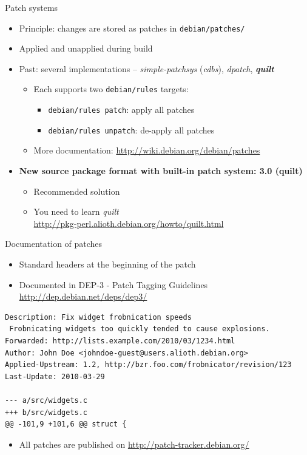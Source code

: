 \documentclass[10pt,final]{beamer}
\begin{document}
\begin{frame}{Patch systems}
  \begin{itemize}
  \item Principle: changes are stored as patches in \texttt{debian/patches/}
    \br
  \item Applied and unapplied during build
    \br
  \item Past: several implementations -- \textsl{simple-patchsys} (\textsl{cdbs}),
    \textsl{dpatch}, \textbf{\textsl{quilt}}
    \begin{itemize}
  \item Each supports two \texttt{debian/rules} targets:
    \begin{itemize}
    \item \texttt{debian/rules patch}: apply all patches
    \item \texttt{debian/rules unpatch}: de-apply all patches
    \end{itemize}
	  \hbr
  \item More documentation: \url{http://wiki.debian.org/debian/patches}
  \end{itemize}
  \br
  \item \textbf{New source package format with built-in patch system: 3.0 (quilt)}
  \begin{itemize}
  \item Recommended solution
	  \hbr
  \item You need to learn \textsl{quilt}\\
    \url{http://pkg-perl.alioth.debian.org/howto/quilt.html}
    
  \end{itemize}
  \end{itemize}
\end{frame}

\begin{frame}[fragile]{Documentation of patches}
  \begin{itemize}
	  \item Standard headers at the beginning of the patch
    \hbr
  \item Documented in DEP-3 - Patch Tagging Guidelines\\
    \url{http://dep.debian.net/deps/dep3/}
  \end{itemize}
  \begin{lstlisting}[basicstyle=\ttfamily\footnotesize]
Description: Fix widget frobnication speeds
 Frobnicating widgets too quickly tended to cause explosions.
Forwarded: http://lists.example.com/2010/03/1234.html
Author: John Doe <johndoe-guest@users.alioth.debian.org>
Applied-Upstream: 1.2, http://bzr.foo.com/frobnicator/revision/123
Last-Update: 2010-03-29

--- a/src/widgets.c
+++ b/src/widgets.c
@@ -101,9 +101,6 @@ struct {
\end{lstlisting}
\begin{itemize}
\item All patches are published on \url{http://patch-tracker.debian.org/}
\end{itemize}
\end{frame}
\end{document}
